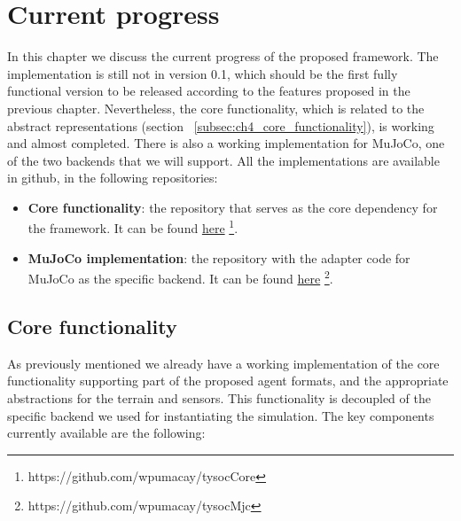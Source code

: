 
\chapter{Current progress}
\label{ch:current_progress}




In this chapter we discuss the current progress of the proposed framework. 
The implementation is still not in version 0.1, which should be the first 
fully functional version to be released according to the features proposed 
in the previous chapter. Nevertheless, the core functionality, which is related
to the abstract representations (section ~\ref{subsec:ch4_core_functionality}),
is working and almost completed. There is also a working implementation for
MuJoCo, one of the two backends that we will support. All the implementations 
are available in github, in the following repositories:

\begin{itemize}
    \item \textbf{Core functionality}: the repository that serves as the
          core dependency for the framework. It can be found \href{https://github.com/wpumacay/tysocCore}{here}
          \footnote{https://github.com/wpumacay/tysocCore}.
    \item \textbf{MuJoCo implementation}: the repository with the
          adapter code for MuJoCo as the specific backend. It can be found
          \href{https://github.com/wpumacay/tysocMjc}{here} \footnote{https://github.com/wpumacay/tysocMjc}.
\end{itemize}

\section{Core functionality}

As previously mentioned we already have a working implementation of the core
functionality supporting part of the proposed agent formats, and the appropriate
abstractions for the terrain and sensors. This functionality is decoupled of the 
specific backend we used for instantiating the simulation. The key components currently 
available are the following:

